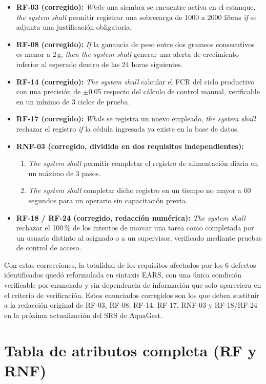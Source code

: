 \documentclass[11pt,a4paper]{report}
\begin{document}
\begin{itemize}[leftmargin=1.4cm]
\item \textbf{RF-03 (corregido):} \emph{While} una siembra se encuentre activa en el estanque, \emph{the system shall} permitir registrar una sobrecarga de 1000 a 2000 libras \emph{if} se adjunta una justificaci\'on obligatoria.
\item \textbf{RF-08 (corregido):} \emph{If} la ganancia de peso entre dos grameos consecutivos es menor a 2\,g, \emph{then the system shall} generar una alerta de crecimiento inferior al esperado dentro de las 24 horas siguientes.
\item \textbf{RF-14 (corregido):} \emph{The system shall} calcular el FCR del ciclo productivo con una precisi\'on de $\pm$0.05 respecto del c\'alculo de control manual, verificable en un m\'inimo de 3 ciclos de prueba.
\item \textbf{RF-17 (corregido):} \emph{While} se registra un nuevo empleado, \emph{the system shall} rechazar el registro \emph{if} la c\'edula ingresada ya existe en la base de datos.
\item \textbf{RNF-03 (corregido, dividido en dos requisitos independientes):}
  \begin{enumerate}[leftmargin=1.1cm]
  \item \emph{The system shall} permitir completar el registro de alimentaci\'on diaria en un m\'aximo de 3 pasos.
  \item \emph{The system shall} completar dicho registro en un tiempo no mayor a 60 segundos para un operario sin capacitaci\'on previa.
  \end{enumerate}
\item \textbf{RF-18 / RF-24 (corregido, redacci\'on num\'erica):} \emph{The system shall} rechazar el 100\,\% de los intentos de marcar una tarea como completada por un usuario distinto al asignado o a un supervisor, verificado mediante pruebas de control de acceso.
\end{itemize}

Con estas correcciones, la totalidad de los requisitos afectados por los 6 defectos identificados qued\'o reformulada en sintaxis EARS, con una \'unica condici\'on verificable por enunciado y sin dependencia de informaci\'on que solo apareciera en el criterio de verificaci\'on. Estos enunciados corregidos son los que deben sustituir a la redacci\'on original de RF-03, RF-08, RF-14, RF-17, RNF-03 y RF-18/RF-24 en la pr\'oxima actualizaci\'on del SRS de AquaGest.

\section{Tabla de atributos completa (RF y RNF)}
\label{sec:atributos}
\end{document}

